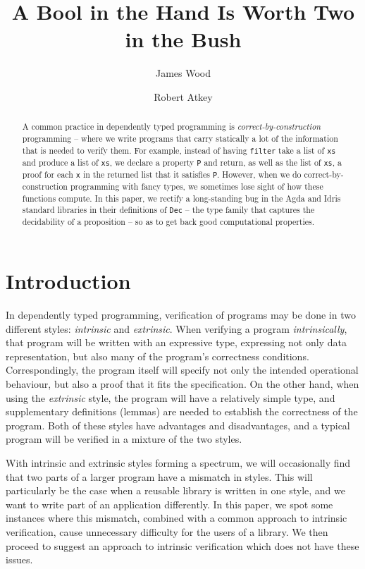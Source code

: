 \documentclass[submission,copyright,creativecommons]{eptcs}
\title{A Bool in the Hand Is Worth Two in the Bush}
\author{
  James Wood
  \institute{Computer and Information Sciences\\
    University of Strathclyde\\
    Glasgow, United Kingdom}
  \email{james.wood.100@strath.ac.uk}
  \and
  Robert Atkey
  \institute{Computer and Information Sciences\\
    University of Strathclyde\\
    Glasgow, United Kingdom}
  \email{robert.atkey@strath.ac.uk}
}
\begin{document}
\maketitle

\begin{abstract}
A common practice in dependently typed programming is
\emph{correct-by-construction} programming -- where we write programs that carry statically a lot of the information that is needed to verify them.
For example, instead of having \texttt{filter} take a list of \texttt{xs} and
produce a list of \texttt{xs}, we declare a property \texttt{P} and return, as
well as the list of \texttt{xs}, a proof for each \texttt{x} in the returned
list that it satisfies \texttt{P}.
However, when we do correct-by-construction programming with fancy types, we
sometimes lose sight of how these functions compute.
In this paper, we rectify a long-standing bug in the Agda and Idris standard
libraries in their definitions of \texttt{Dec} -- the type family that captures
the decidability of a proposition -- so as to get back good computational
properties.
\end{abstract}

\section{Introduction}


In dependently typed programming, verification of programs may be done in two
different styles: \emph{intrinsic} and \emph{extrinsic}.
When verifying a program \emph{intrinsically}, that program will be written with an expressive type, expressing not only data representation, but also
many of the program's correctness conditions.
Correspondingly, the program itself will specify not only the intended
operational behaviour, but also a proof that it fits the specification.
On the other hand, when using the \emph{extrinsic} style, the program will
have a relatively simple type, and supplementary definitions (lemmas) are
needed to establish the correctness of the program.
Both of these styles have advantages and disadvantages, and a typical program
will be verified in a mixture of the two styles.

With intrinsic and extrinsic styles forming a spectrum, we will occasionally
find that two parts of a larger program have a mismatch in styles.
This will particularly be the case when a reusable library is written in one
style, and we want to write part of an application differently.
In this paper, we spot some instances where this mismatch, combined with a
common approach to intrinsic verification, cause unnecessary difficulty for the
users of a library.
We then proceed to suggest an approach to intrinsic verification which does not
have these issues.
\end{document}
